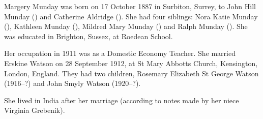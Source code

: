
Margery Munday was born on 17 October 1887 in	Surbiton, Surrey, to John Hill Munday () and Catherine Aldridge (). She had four siblings: Nora Katie Munday (), Kathleen Munday (), Mildred Mary Munday () and Ralph Munday ().
She was educated in Brighton, Sussex, at Roedean School.

Her occupation in 1911 was as a Domestic Economy Teacher. \cite{MMundayOccupation}
She married Erskine Watson on 28 September 1912, at St Mary Abbotts Church, Kensington, London, England.  They had two children, Rosemary Elizabeth St George Watson (1916--?) and John Smyly Watson (1920--?).

She lived in India after her marriage (according to notes made by her niece Virginia Grebenik).
